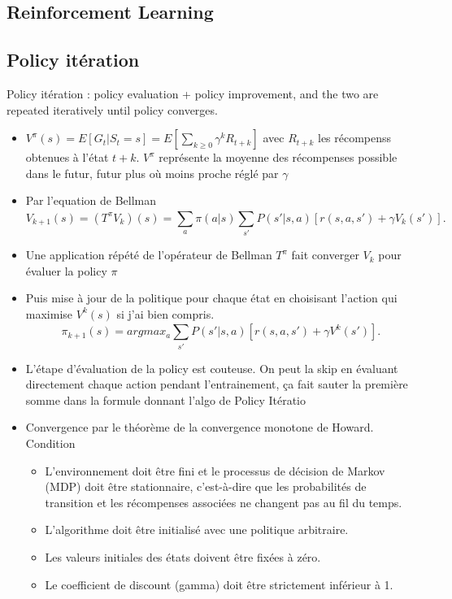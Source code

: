 \documentclass{article}
\begin{document}
\begin{multicols}{2}
\section{Reinforcement Learning}
\subsection{Policy itération}
Policy itération : policy evaluation + policy improvement, and the two are repeated iteratively until policy converges.
\begin{itemize}
    \item $ V^\pi (s) = E[G_t | S_t = s] = E[ \sum_{k \geq 0}^{} \gamma ^k R_{t+k}] $ avec $ R_{t+k} $ les récompenss obtenues à l'état $ t+k $. $ V^\pi $ représente la moyenne des récompenses possible dans le futur, futur plus où moins proche réglé par $ \gamma  $ 
    \item Par l'equation de Bellman
    \[
        V_{k+1}(s) = (T^\pi V_k)(s) = \sum_{a}^{}\pi (a | s) \sum_{s'}^{}P(s' | s, a) [r(s, a, s') + \gamma V_k(s')]
    .\]
    \item Une application répété de l'opérateur de Bellman $ T^\pi  $ fait converger $ V_k $ pour évaluer la policy $ \pi  $ 
    \item Puis mise à jour de la politique pour chaque état en choisisant l'action qui maximise $ V^k(s) $ si j'ai bien compris. 
    \[
        \pi _{k+1}(s) = argmax_a \sum_{s'}^{} P(s' | s, a) [ r(s, a, s') + \gamma V^{k}(s')]
    .\]
    \item L'étape d'évaluation de la policy est couteuse. On peut la skip en évaluant directement chaque action pendant l'entrainement, ça fait sauter la première somme dans la formule donnant l'algo de Policy Itératio
    \item Convergence par le théorème de la convergence monotone de Howard. Condition \begin{itemize}
        \item L'environnement doit être fini et le processus de décision de Markov (MDP) doit être stationnaire, c'est-à-dire que les probabilités de transition et les récompenses associées ne changent pas au fil du temps.
        \item L'algorithme doit être initialisé avec une politique arbitraire.
        \item Les valeurs initiales des états doivent être fixées à zéro.
        \item Le coefficient de discount (gamma) doit être strictement inférieur à 1.
    \end{itemize}
\end{itemize}



\end{multicols}
\end{document}
